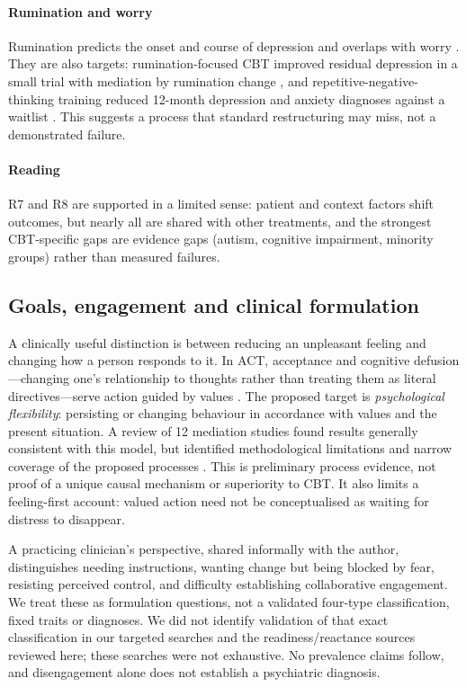 \paragraph{Rumination and worry} Rumination predicts the onset and course of depression and overlaps with worry \citep{nolenhoeksema2008rumination}.
They are also targets: rumination-focused CBT improved residual depression in a small trial with mediation by rumination change \citep{watkins2011rfcbt}, and repetitive-negative-thinking training reduced 12-month depression and anxiety diagnoses against a waitlist \citep{topper2017worryrumination}.
This suggests a process that standard restructuring may miss, not a demonstrated failure.

\paragraph{Reading} R7 and R8 are supported in a limited sense: patient and context factors shift outcomes, but nearly all are shared with other treatments, and the strongest CBT-specific gaps are evidence gaps (autism, cognitive impairment, minority groups) rather than measured failures.

\subsection{Goals, engagement and clinical formulation}\label{sec:clinicalformulation}
A clinically useful distinction is between reducing an unpleasant feeling and changing how a person responds to it.
In ACT, acceptance and cognitive defusion---changing one's relationship to thoughts rather than treating them as literal directives---serve action guided by values \citep{hayes2006act}.
The proposed target is \emph{psychological flexibility}: persisting or changing behaviour in accordance with values and the present situation.
A review of 12 mediation studies found results generally consistent with this model, but identified methodological limitations and narrow coverage of the proposed processes \citep{stockton2019mediation}.
This is preliminary process evidence, not proof of a unique causal mechanism or superiority to CBT.
It also limits a feeling-first account: valued action need not be conceptualised as waiting for distress to disappear.

A practicing clinician's perspective, shared informally with the author, distinguishes needing instructions, wanting change but being blocked by fear, resisting perceived control, and difficulty establishing collaborative engagement.
We treat these as formulation questions, not a validated four-type classification, fixed traits or diagnoses.
We did not identify validation of that exact classification in our targeted searches and the readiness/reactance sources reviewed here; these searches were not exhaustive.
No prevalence claims follow, and disengagement alone does not establish a psychiatric diagnosis.

